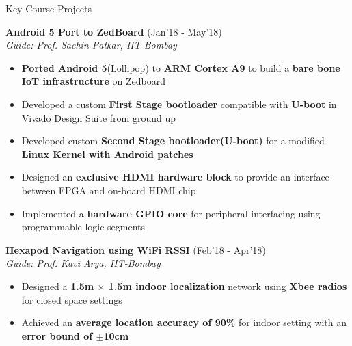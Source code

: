 \documentclass{resume}
\newcommand{\sepval}{-0.5em}
\begin{document}
\begin{rSection}{Key Course Projects}

\vspace{-0.4cm}

\item {\bf Android 5 Port to ZedBoard} \hfill{(Jan'18 - May'18)}\\

\emph{Guide: Prof. Sachin Patkar, IIT-Bombay}\\ 
[-0.6cm]

\begin{itemize}[leftmargin=*]

	\itemsep \sepval

	\item {\bf Ported Android 5}(Lollipop) to {\bf ARM Cortex A9} to build a {\bf bare bone IoT infrastructure} on Zedboard
	
	\item Developed a custom {\bf First Stage bootloader} compatible with {\bf U-boot} in Vivado Design Suite from ground up

	\item Developed custom {\bf Second Stage bootloader(U-boot)} for a modified {\bf Linux Kernel with Android patches}
	
	\item Designed an {\bf exclusive HDMI hardware block} to provide an interface between FPGA and on-board HDMI chip
	
	\item Implemented a {\bf hardware GPIO core} for peripheral interfacing using programmable logic segments
	
\end{itemize}

\item {\bf Hexapod Navigation using WiFi RSSI} \hfill{(Feb'18 - Apr'18)}\\

\emph{Guide: Prof. Kavi Arya, IIT-Bombay}\\ 
[-0.6cm]

\begin{itemize}[leftmargin=*]

	\itemsep \sepval

	\item Designed a {\bf 1.5m $\times$ 1.5m indoor localization} network using {\bf Xbee radios} for closed space settings
	
	\item Achieved an {\bf average location accuracy of 90\%} for indoor setting with an {\bf error bound of $\pm$10cm}


\end{itemize}
\end{rSection}
\end{document}
